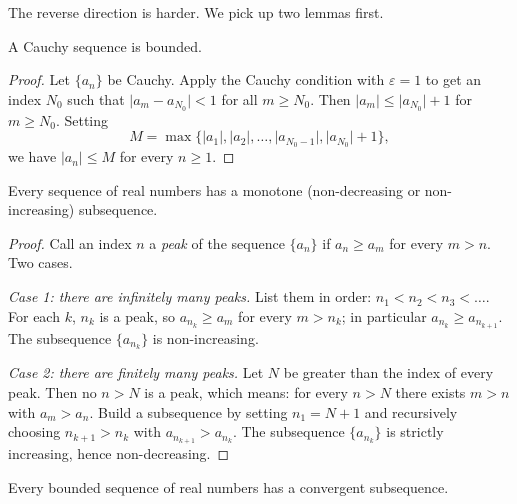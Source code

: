 The reverse direction is harder. We pick up two lemmas first.

\begin{proposition}\label{prop:cauchy-bounded}
A Cauchy sequence is bounded.
\end{proposition}

\begin{proof}
Let \(\{a_{n}\}\) be Cauchy. Apply the Cauchy condition with \(\varepsilon = 1\) to get an index \(N_{0}\) such that \(\lvert a_{m} - a_{N_{0}} \rvert < 1\) for all \(m \geq N_{0}\). Then \(\lvert a_{m} \rvert \leq \lvert a_{N_{0}} \rvert + 1\) for \(m \geq N_{0}\). Setting
\[
M = \max\bigl\{\lvert a_{1} \rvert, \lvert a_{2} \rvert, \dots, \lvert a_{N_{0} - 1} \rvert, \lvert a_{N_{0}} \rvert + 1\bigr\},
\]
we have \(\lvert a_{n} \rvert \leq M\) for every \(n \geq 1\).
\end{proof}

\begin{proposition}\label{prop:monotone-subsequence}
Every sequence of real numbers has a monotone (non-decreasing or non-increasing) subsequence.
\end{proposition}

\begin{proof}
Call an index \(n\) a \emph{peak} of the sequence \(\{a_{n}\}\) if \(a_{n} \geq a_{m}\) for every \(m > n\). Two cases.

\emph{Case 1: there are infinitely many peaks.} List them in order: \(n_{1} < n_{2} < n_{3} < \dots\). For each \(k\), \(n_{k}\) is a peak, so \(a_{n_{k}} \geq a_{m}\) for every \(m > n_{k}\); in particular \(a_{n_{k}} \geq a_{n_{k + 1}}\). The subsequence \(\{a_{n_{k}}\}\) is non-increasing.

\emph{Case 2: there are finitely many peaks.} Let \(N\) be greater than the index of every peak. Then no \(n > N\) is a peak, which means: for every \(n > N\) there exists \(m > n\) with \(a_{m} > a_{n}\). Build a subsequence by setting \(n_{1} = N + 1\) and recursively choosing \(n_{k + 1} > n_{k}\) with \(a_{n_{k + 1}} > a_{n_{k}}\). The subsequence \(\{a_{n_{k}}\}\) is strictly increasing, hence non-decreasing.
\end{proof}

\begin{theorem}\label{thm:bolzano-weierstrass}
Every bounded sequence of real numbers has a convergent subsequence.
\end{theorem}

